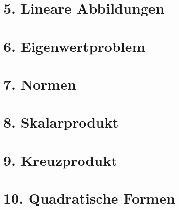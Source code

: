 \begin{multicols*}{4}
\section{5. Lineare Abbildungen}
\WhiteSpace
	
	
	
	
\section{6. Eigenwertproblem}
\WhiteSpace
	
	
	
	
	
	
	

\section{7. Normen}
\WhiteSpace
	
	
	
	
	
\section{8. Skalarprodukt}
\WhiteSpace
	
	
	
	
	
\section{9. Kreuzprodukt}
\WhiteSpace
	
	
	
	
\section{10. Quadratische Formen}
\WhiteSpace
	
	
	
	
	
	
	
	


\end{multicols*}
